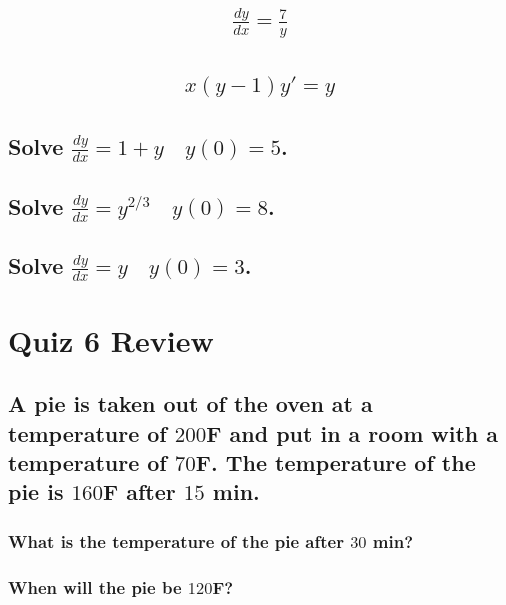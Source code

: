 \documentclass{article}
\begin{document}
\subsection{
	\begin{align*}
		\frac{dy}{dx} = \frac{7}{y}
	\end{align*}
}

\subsection{
	\begin{align*}
		x(y - 1)y' = y
	\end{align*}
}

\subsection{Solve $\frac{dy}{dx} = 1 + y \quad y(0) = 5$.}

\subsection{Solve $\frac{dy}{dx} = y^{2/3} \quad y(0) = 8$.}

\subsection{Solve $\frac{dy}{dx} = y \quad y(0) = 3$.}








\newpage
\section{Quiz 6 Review}

\subsection{A pie is taken out of the oven at a temperature of $200$F and put in a room with a temperature of $70$F. The temperature of the pie is $160$F after $15$ min.}
\subsubsection{What is the temperature of the pie after $30$ min?}
\subsubsection{When will the pie be $120$F?}
\end{document}

